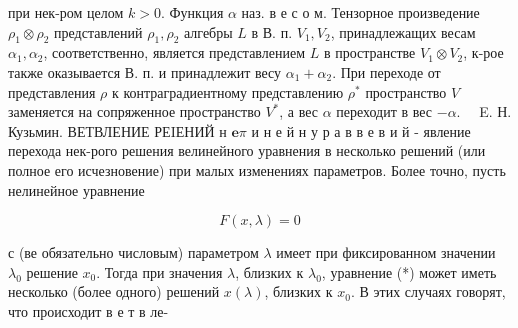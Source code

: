 \documentclass[10pt]{article}
\begin{document}
при нек-ром целом $k>0$. Функция $\alpha$ наз. в е с о м. Тензорное произведение $\rho_{1} \otimes \rho_{2}$ представлений $\rho_{1}, \rho_{2}$ алгебры $L$ в В. п. $V_{1}, V_{2}$, принадлежащих весам $\alpha_{1}, \alpha_{2}$, соответственно, является представлением $L$ в пространстве $V_{1} \otimes V_{2}$, к-рое также оказывается В. п. и принадлежит весу $\alpha_{1}+\alpha_{2}$. При переходе от представления $\rho$ к контраградиентному представлению $\rho^{*}$ пространство $V$ заменяется на сопряженное пространство $V^{*}$, а вес $\alpha$ переходит в вес $-\alpha . \quad$ E. Н. Кузьмин. ВЕТВЛЕНИЕ РЕIЕНИЙ н $\boldsymbol{e} \pi$ и $н$ $е$ й н у р а в в е в и й - явление перехода нек-рого решения велинейного уравнения в несколько решений (или полное его исчезновение) при малых изменениях параметров. Более точно, пусть нелинейное уравнение



\[

F(x, \lambda)=0

\]



с (ве обязательно числовым) параметром $\lambda$ имеет при фиксированном значении $\lambda_{0}$ решение $x_{0}$. Тогда при значения $\lambda$, близких к $\lambda_{0}$, уравнение (*) может иметь несколько (более одного) решений $x(\lambda)$, близких к $x_{0}$. В этих случаях говорят, что происходит в е т в ле-
\end{document}
